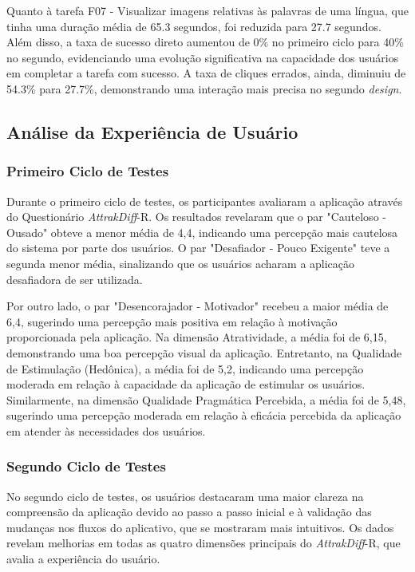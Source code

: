 Quanto à tarefa F07 - Visualizar imagens relativas às palavras de uma língua, que tinha uma duração média de 65.3 segundos, foi reduzida para 27.7 segundos. Além disso, a taxa de sucesso direto aumentou de 0\% no primeiro ciclo para 40\% no segundo, evidenciando uma evolução 
significativa na capacidade dos usuários em completar a tarefa com sucesso. A taxa de cliques errados, ainda, diminuiu de 54.3\% para 27.7\%, demonstrando uma interação mais precisa no segundo \textit{design}.

\subsection{Análise da Experiência de Usuário}
\label{sec:Análise da Experiência de Usuário}

\subsubsection{Primeiro Ciclo de Testes}
\label{sec:Primeiro Ciclo de Testes2}
Durante o primeiro ciclo de testes, os participantes avaliaram a aplicação através do Questionário \textit{AttrakDiff}-R. Os resultados revelaram que o par "Cauteloso - Ousado" obteve a menor média de 4,4, indicando uma percepção mais cautelosa do sistema por parte dos usuários. O par 
"Desafiador - Pouco Exigente" teve a segunda menor média, sinalizando que os usuários acharam a aplicação desafiadora de ser utilizada.

Por outro lado, o par "Desencorajador - Motivador" recebeu a maior média de 6,4, sugerindo uma percepção mais positiva em relação à motivação proporcionada pela aplicação. Na dimensão Atratividade, a média foi de 6,15, demonstrando uma boa percepção visual da aplicação. Entretanto, 
na Qualidade de Estimulação (Hedônica), a média foi de 5,2, indicando uma percepção moderada em relação à capacidade da aplicação de estimular os usuários. Similarmente, na dimensão Qualidade Pragmática Percebida, a média foi de 5,48, sugerindo uma percepção moderada em relação à 
eficácia percebida da aplicação em atender às necessidades dos usuários.

\subsubsection{Segundo Ciclo de Testes}
\label{sec:Segundo Ciclo de Testes2}
No segundo ciclo de testes, os usuários destacaram uma maior clareza na compreensão da aplicação devido ao passo a passo inicial e à validação das mudanças nos fluxos do aplicativo, que se mostraram mais intuitivos. Os dados revelam melhorias em todas as quatro dimensões principais do 
\textit{AttrakDiff}-R, que avalia a experiência do usuário. 

